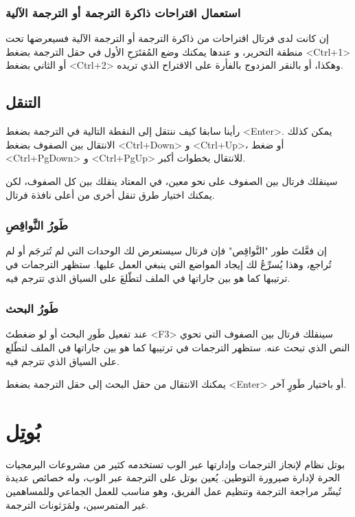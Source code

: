 \subsubsection{استعمال اقتراحات ذاكرة الترجمة أو الترجمة الآلية}

إن كانت لدى فرتال اقتراحات من ذاكرة الترجمة أو الترجمة الآلية فسيعرضها
تحت منطقة التحرير، و عندها يمكنك وضع المُقتَرَحِ الأول في حقل الترجمة
بضغط <Ctrl+1> أو الثاني بضغط <Ctrl+2> وهكذا، أو بالنقر المزدوج بالفأرة
على الاقتراح الذي تريده.

\subsection{التنقل}
رأينا سابقا كيف ننتقل إلى النقطة التالية في الترجمة بضغط <Enter>. يمكن
كذلك الانتقال بين الصفوف بضغط <Ctrl+Down> و <Ctrl+Up>، أو ضغط
<Ctrl+PgDown> و <Ctrl+PgUp> للانتقال بخطوات أكبر.

سينقلك فرتال بين الصفوف على نحو معين، في المعتاد ينقلك بين كل الصفوف،
لكن يمكنك اختيار طرق تنقل أخرى من أعلى نافذة فرتال.

\subsubsection{طَورُ النَّواقِصِ}
إن فعَّلتَ طور "النَّواقِص" فإن فرتال سيستعرض لك الوحدات التي لم تُترجَم
أو لم تُراجع، وهذا يُسرِّعُ لك إيجاد المواضع التي ينبغي العمل عليها.
ستظهر الترجمات في ترتيبها كما هو بين جاراتها في الملف لتطّلعَ على
السياق الذي تترجم فيه.

\subsubsection{طَورُ البحث}
عند تفعيل طَورِ البحث أو لو ضغطتَ <F3> سينقلك فرتال بين الصفوف التي تحوي
النص الذي تبحث عنه. ستظهر الترجمات في ترتيبها كما هو بين جاراتها في
الملف لتطّلع على السياق الذي تترجم فيه.

يمكنك الانتقال من حقل البحث إلى حقل الترجمة بضغط <Enter> أو باختيار
طَورٍ آخر.

\section{بُوتِل}
بوتل نظام لإنجاز الترجمات وإدارتها عبر الوب تستخدمه كثير من مشروعات
البرمجيات الحرة لإدارة صيرورة التوطين. يُعين بوتل على الترجمة عبر الوب،
وله خصائص عديدة تُيسِّر مراجعة الترجمة وتنظيم عمل الفريق، وهو مناسب
للعمل الجماعي وللمساهمين غير المتمرسين، ولمَرَثونات الترجمة.

